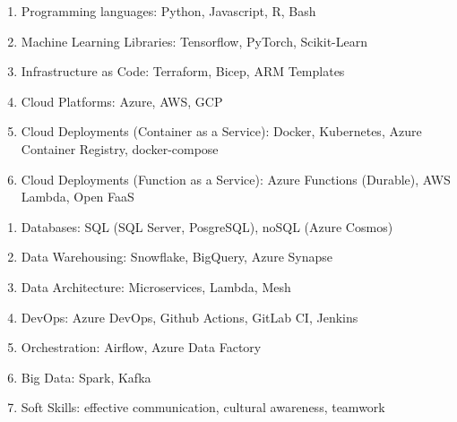 \documentclass[a4paper, 12]{scrartcl}
\newcommand{\preSectionSpace}{\vspace{4pt}}
\newcommand{\composedCvSection}[1]{\preSectionSpace{\large\textcolor{black}{#1}}}
\begin{document}
            \parbox{1.0\linewidth}{
                \composedCvSection{Skills}
                
                \parbox{0.49\linewidth}{
		          \begin{flushleft}
                        \begin{enumerate}
                            \item Programming languages: Python, Javascript, R, Bash
                            \item Machine Learning Libraries: Tensorflow, PyTorch, Scikit-Learn
                            \item Infrastructure as Code: Terraform, Bicep, ARM Templates
                            \item Cloud Platforms: Azure, AWS, GCP
                            \item Cloud Deployments (Container as a Service): Docker, Kubernetes, Azure Container Registry, docker-compose
                            \item Cloud Deployments (Function as a Service): Azure Functions (Durable), AWS Lambda, Open FaaS
                        \end{enumerate}
	       	   \end{flushleft}
                }
                \parbox{0.49\linewidth}{
                     \begin{flushleft}
                        \begin{enumerate}
                            \item Databases: SQL (SQL Server, PosgreSQL), noSQL (Azure Cosmos)
        				\item Data Warehousing: Snowflake, BigQuery, Azure Synapse
        				\item Data Architecture: Microservices, Lambda, Mesh
                            \item DevOps: Azure DevOps, Github Actions, GitLab CI, Jenkins
                            \item Orchestration: Airflow, Azure Data Factory
                            \item Big Data: Spark, Kafka
                            \item Soft Skills: effective communication, cultural awareness, teamwork
                        \end{enumerate}
	       	   \end{flushleft}
                }}
            
\end{document}
